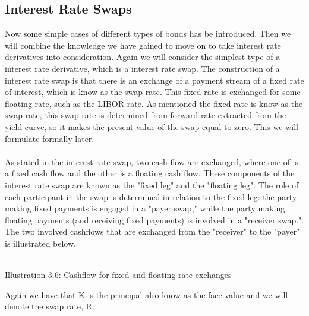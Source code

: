 \subsection{Interest Rate Swaps}
Now some simple cases of different types of bonds has be introduced. Then we will combine the knowledge we have gained to move on
to take interest rate derivatives into consideration. Again we will consider the simplest type of a interest rate derivative, which is a
interest rate swap. The construction of a interest rate swap is that there is an  exchange of a payment stream of a fixed rate of interest,
which is know as the swap rate. This fixed rate is exchanged for some floating rate, such as the LIBOR rate. 
As mentioned the fixed rate is know as the swap rate, this swap rate is determined from forward rate extracted from the yield curve, 
so it makes the present value of the swap equal to zero. This we will formulate formally later. 
\\\\
As stated in the interest rate swap, two cash flow are exchanged, where one of is a 
fixed cash flow and the other is a floating cash flow. These components of
the interest rate swap are known as the "fixed leg" and the "floating leg". 
The role of each participant in the swap is determined in relation to the 
fixed leg: the party making fixed payments is engaged in a "payer swap," 
while the party making floating payments (and receiving fixed payments) is
involved in a "receiver swap.". The two involved cashflows that are exchanged from the "receiver" to the "payer" is illustrated below.
\\
\begin{center}
    \\[10pt] 
    Illustration 3.6: Cashflow for fixed and floating rate exchanges
\end{center} 
\noindent
Again we have that K is the principal also know as the face value and we will denote the swap rate, R.
